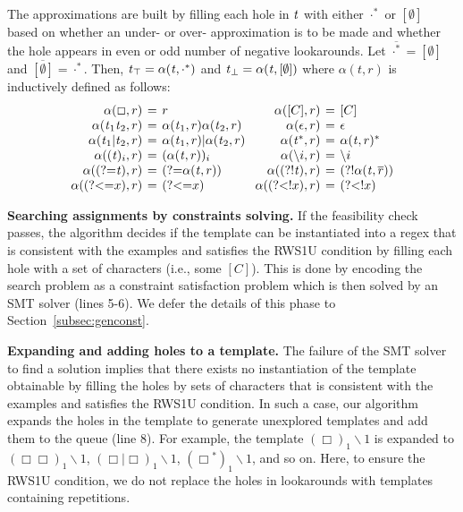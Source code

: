 \documentclass[conference]{IEEEtran}
\newcommand{\hole}{\Box}
\newcommand{\sstate}{{\it t}}
\newcommand{\any}{\cdot}
\newcommand{\ltp}{RWS1U}
\newcommand{\tapprox}{\alpha}
\begin{document}
The approximations are built by filling each hole in $\sstate{}$ with either 
$\any^*$ or $[\emptyset]$ based on whether an under- or over- approximation is to be made and whether the hole appears in even or odd number of negative lookarounds.  Let $\overline{\any^*} = [\emptyset]$ and $\overline{[\emptyset]} = \any^*$.  Then, $\sstate{}_\top = \tapprox(\sstate{},\any^*)$ and $\sstate{}_\bot = \tapprox(\sstate{},[\emptyset])$ where $\tapprox(t,r)$ is inductively defined as follows:
\[
\setlength\arraycolsep{2pt}
\begin{array}{rclcrcl}
\tapprox(\hole,r) & = & r & &\tapprox([C],r) & = & [C] \\
\tapprox(\sstate{}_1\sstate{}_2,r) & = & \tapprox(\sstate{}_1,r)\tapprox(\sstate{}_2,r) & & \tapprox(\epsilon,r) & = & \epsilon \\
\tapprox(\sstate{}_1|\sstate{}_2,r) & = & \tapprox(\sstate{}_1,r)|\tapprox(\sstate{}_2,r) & & \tapprox(\sstate{}^*,r) & = & \tapprox(\sstate{},r)^* \\
\tapprox((\sstate{})_i,r) & = & (\tapprox(\sstate{},r))_i & & \tapprox(\backslash i,r) & = & \backslash i \\
\tapprox(\mbox{(?=$\sstate{}$)},r) & = & \mbox{(?=$\tapprox(\sstate{},r)$)} & &\tapprox(\mbox{(?!$\sstate{}$)},r) & = & \mbox{(?!$\tapprox(\sstate{},\overline{r})$)} \\
\tapprox(\mbox{(?\textless=$x$)},r) & = & \mbox{(?\textless=$x$)} & & \tapprox(\mbox{(?\textless!$x$)},r) & = & \mbox{(?\textless!$x$)} 
\end{array}
\]





{\flushleft\bf Searching assignments by constraints solving.}
If the feasibility check passes, the algorithm decides if the template can be instantiated into a regex that is consistent with the examples and satisfies the \ltp{} condition by filling each hole with a set of characters (i.e., some $[C]$).  This is done by encoding the search problem as a constraint satisfaction problem which is then solved by an SMT solver (lines 5-6).
We defer the details of this phase to Section~\ref{subsec:genconst}.

{\flushleft\bf Expanding and adding holes to a template.}
The failure of the SMT solver to find a solution implies that there exists no instantiation of the
template obtainable by filling the holes by sets of characters that is consistent with the examples and satisfies the \ltp{} condition.  In such a case, our algorithm expands the holes in the template to generate unexplored templates and add them to the queue (line 8).  For example, the template $(\hole{})_1\backslash 1$ is expanded to $(\hole{}\hole{})_1 \backslash 1$, $(\hole{}|\hole{})_1 \backslash 1$, $(\hole{}^*)_1 \backslash 1$, and so on. 
Here, to ensure the \ltp{} condition, we do not replace the holes in lookarounds with templates containing repetitions.  
\end{document}
